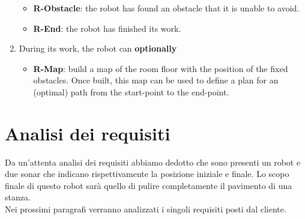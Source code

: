 \documentclass{llncs}
\begin{document}
\begin{enumerate}
\begin{itemize}
            \item \textbf{R-Obstacle}: the robot has found an obstacle that it is unable to avoid.
            \item \textbf{R-End}: the robot has finished its work.
        \end{itemize}
    \item During its work, the robot can \textbf{optionally}
        \begin{itemize}
            \item \textbf{R-Map}: build a map of the room floor with the position of the fixed obstacles. Once built, this map can be
used to define a plan for an (optimal) path from the start-point to the end-point.
        \end{itemize}
\end{enumerate}

\pagebreak

\section{Analisi dei requisiti}
\label{ReqAnalysis}
Da un'attenta analisi dei requisiti abbiamo dedotto che sono presenti un robot e due sonar che indicano rispettivamente la posizione iniziale e finale. Lo scopo finale di questo robot sar\`a quello di pulire completamente il pavimento di una stanza.\\
Nei prossimi paragrafi verranno analizzati i singoli requisiti posti dal cliente.

\end{document}
